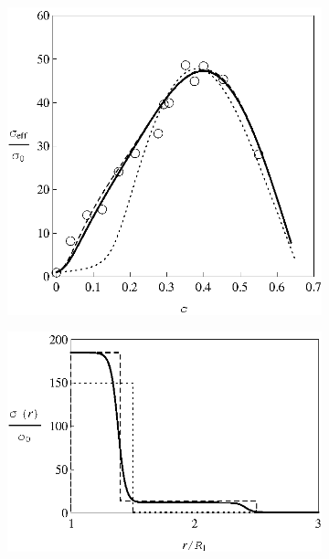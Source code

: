 \documentclass[twoside,a4paper,14pt]{vakaref-utf8}
\begin{document}
\begin{figure}[tb]
	\centering
	\begin{subfigure}[c]{0.45\textwidth}
		\includegraphics[width=\textwidth]{Fig12_Liang_LiI-Al2O3-Processing.eps}
		\caption{} \label{fig:Liang_LiI-Al2O3-Processing-a}
	\end{subfigure}%
	\quad
	\begin{subfigure}[c]{0.35\textwidth}
		\includegraphics[width=\textwidth]{Fig13_Liang_LiI-Al2O3-Profile.eps}\\ 

\end{subfigure}
\end{figure}
\end{document}
